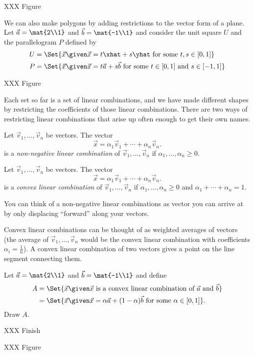 XXX Figure

We can also make polygons by adding restrictions to the vector form of a plane. Let
$\vec a=\mat{2\\1}$ and $\vec b=\mat{-1\\1}$ and consider the unit square $U$ and
the parallelogram $P$ defined by
\begin{align*}
	U&=\Set{\vec x\given \vec x=t\xhat+s\yhat\text{ for some }t,s\in [0,1]}\\
	P&=\Set{\vec x\given \vec x=t\vec a+s\vec b\text{ for some }t\in [0,1]\text{ and }s\in[-1,1]}
\end{align*}

XXX Figure

Each set so far is a set of linear combinations, and we 
have made different shapes by restricting the coefficients of those linear
combinations. There are two ways of restricting linear combinations that arise
up often enough to get their own names.

\begin{definition}
	Let $\vec v_1,\ldots,\vec v_n$ be vectors.
	The vector 
	\[
		\vec x=\alpha_1\vec v_1+\cdots+\alpha_n\vec v_n.
	\]
	is a \emph{non-negative linear combination} of $\vec v_1,\ldots,\vec v_n$
	if $\alpha_1,\ldots,\alpha_n\geq 0$.
\end{definition}

\begin{definition}
	Let $\vec v_1,\ldots,\vec v_n$ be vectors.
	The vector 
	\[
		\vec x=\alpha_1\vec v_1+\cdots+\alpha_n\vec v_n.
	\]
	is a \emph{convex linear combination} of $\vec v_1,\ldots,\vec v_n$
	if $\alpha_1,\ldots,\alpha_n\geq 0$ and $\alpha_1+\cdots+\alpha_n=1$.
\end{definition}

You can think of a non-negative linear combinations as vector you can arrive at by
only displacing ``forward'' along your vectors.

Convex linear combinations can be thought of as weighted averages of vectors (the average of $\vec v_1,\ldots,
\vec v_n$ would be the convex linear combination with coefficients $\alpha_i=\frac{1}{n}$). 
A convex linear combination
of two vectors gives a point on the line segment connecting them. 

\begin{example}
	Let $\vec a=\mat{2\\1}$ and $\vec b=\mat{-1\\1}$ and define
	\begin{align*}
		A&=\Set{\vec x\given \vec x\text{ is a convex linear combination of }\vec a\text{ and }\vec b}\\
		&=\Set{\vec x\given \vec x=\alpha\vec a+(1-\alpha)\vec b\text{ for some }\alpha\in [0,1]}.
	\end{align*}
	Draw $A$.

	XXX Finish

	XXX Figure
\end{example}

